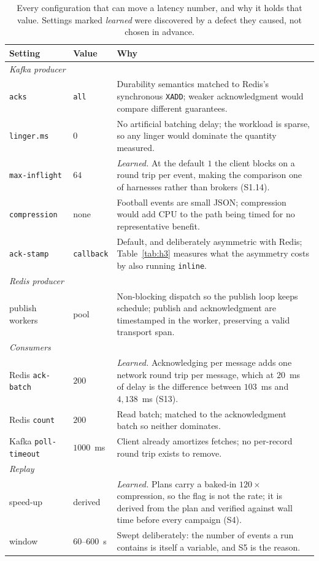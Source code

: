 \documentclass[10pt,journal,onecolumn]{IEEEtran}
\newcommand{\kafka}{Kafka}
\newcommand{\redis}{Redis}
\begin{document}
\begin{table}[t]
\caption[Every configuration that can move a latency number, and why it holds that value]{Every configuration that can move a latency number, and why it holds that value.
Settings marked \textnormal{\textit{learned}} were discovered by a defect they caused, not chosen in advance.}
\label{tab:config}
\small
\begin{tabular}{llp{}}
\toprule
Setting & Value & Why \\
\midrule
\multicolumn{3}{l}{\emph{\kafka{} producer}} \\
\texttt{acks} & \texttt{all} & Durability semantics matched to \redis{}'s synchronous
\texttt{XADD}; weaker acknowledgment would compare different guarantees. \\
\texttt{linger.ms} & $0$ & No artificial batching delay; the workload is sparse, so any linger
would dominate the quantity measured. \\
\texttt{max-inflight} & $64$ & \emph{Learned.} At the default $1$ the client blocks on a round
trip per event, making the comparison one of harnesses rather than brokers (S1.14). \\
\texttt{compression} & none & Football events are small JSON; compression would add CPU to the
path being timed for no representative benefit. \\
\texttt{ack-stamp} & \texttt{callback} & Default, and deliberately asymmetric with \redis{};
Table~\ref{tab:h3} measures what the asymmetry costs by also running \texttt{inline}. \\
\midrule
\multicolumn{3}{l}{\emph{\redis{} producer}} \\
publish workers & pool & Non-blocking dispatch so the publish loop keeps schedule; publish and
acknowledgment are timestamped in the worker, preserving a valid transport span. \\
\midrule
\multicolumn{3}{l}{\emph{Consumers}} \\
\redis{} \texttt{ack-batch} & $200$ & \emph{Learned.} Acknowledging per message adds one network
round trip per message, which at $20$~ms of delay is the difference between $103$~ms and
$4{,}138$~ms (S13). \\
\redis{} \texttt{count} & $200$ & Read batch; matched to the acknowledgment batch so neither
dominates. \\
\kafka{} \texttt{poll-timeout} & $1000$~ms & Client already amortizes fetches; no per-record
round trip exists to remove. \\
\midrule
\multicolumn{3}{l}{\emph{Replay}} \\
speed-up & derived & \emph{Learned.} Plans carry a baked-in $120\times$ compression, so the flag
is not the rate; it is derived from the plan and verified against wall time before every campaign (S4). \\
window & $60$--$600$~s & Swept deliberately: the number of events a run contains is itself a
variable, and S5 is the reason. \\
\bottomrule
\end{tabular}
\end{table}
\end{document}
